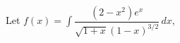 \documentclass[preview]{standalone}
\begin{document}
\begin{center}
Let $f(x) = \int \dfrac{(2-x^2)e^x}{\sqrt{1+x}(1-x)^{3/2}}\,dx$,
\end{center}
\end{document}
